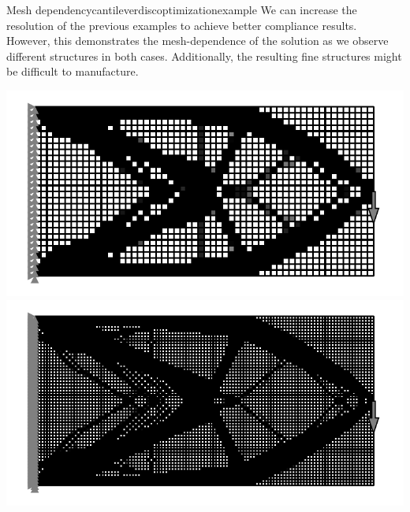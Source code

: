 \begin{example}{Mesh dependency}{cantileverdiscoptimizationexample}
    We can increase the resolution of the previous examples to achieve better compliance results. However, this demonstrates the mesh-dependence of the solution as we observe different structures in both cases. Additionally, the resulting fine structures might be difficult to manufacture.
    \begin{center}
        \includegraphics[width=0.7\linewidth]{figures/cantilever_fem_optimized_binary_fine.pdf}
        \includegraphics[width=0.7\linewidth]{figures/cantilever_fem_optimized_binary_extra_fine.pdf}
    \end{center}
\end{example}

